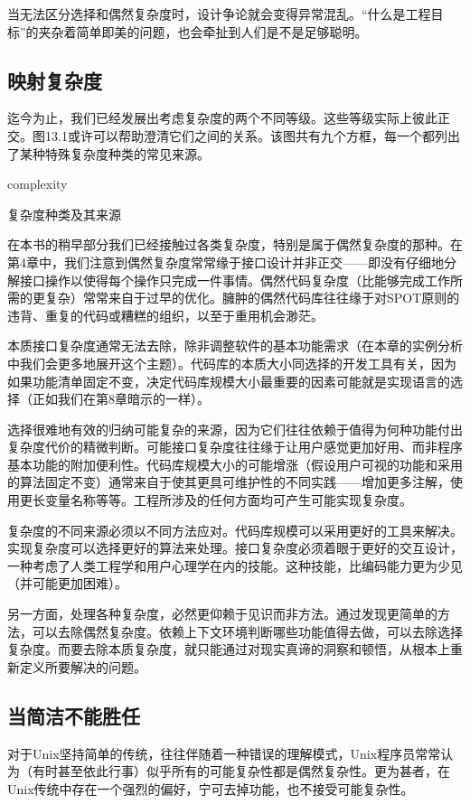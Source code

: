 \documentclass[12pt,oneside]{ctexbook}
\begin{document}
\begin{common-format}
当无法区分选择和偶然复杂度时，设计争论就会变得异常混乱。“什么是工程目标”的夹杂着简单即美的问题，也会牵扯到人们是不是足够聪明。

\subsection{映射复杂度}
迄今为止，我们已经发展出考虑复杂度的两个不同等级。这些等级实际上彼此正交。图13.1或许可以帮助澄清它们之间的关系。该图共有九个方框，每一个都列出了某种特殊复杂度种类的常见来源。

\begin{linefig}[0.8]{complexity}
\caption{复杂度种类及其来源}
\label{fig:complexity}
\end{linefig}

在本书的稍早部分我们已经接触过各类复杂度，特别是属于偶然复杂度的那种。在第4章中，我们注意到偶然复杂度常常缘于接口设计并非正交——即没有仔细地分解接口操作以使得每个操作只完成一件事情。偶然代码复杂度（比能够完成工作所需的更复杂）常常来自于过早的优化。臃肿的偶然代码库往往缘于对SPOT原则的违背、重复的代码或糟糕的组织，以至于重用机会渺茫。

本质接口复杂度通常无法去除，除非调整软件的基本功能需求（在本章的实例分析中我们会更多地展开这个主题）。代码库的本质大小同选择的开发工具有关，因为如果功能清单固定不变，决定代码库规模大小最重要的因素可能就是实现语言的选择（正如我们在第8章暗示的一样）。

选择很难地有效的归纳可能复杂的来源，因为它们往往依赖于值得为何种功能付出复杂度代价的精微判断。可能接口复杂度往往缘于让用户感觉更加好用、而非程序基本功能的附加便利性。代码库规模大小的可能增涨（假设用户可视的功能和采用的算法固定不变）通常来自于使其更具可维护性的不同实践——增加更多注解，使用更长变量名称等等。工程所涉及的任何方面均可产生可能实现复杂度。

复杂度的不同来源必须以不同方法应对。代码库规模可以采用更好的工具来解决。实现复杂度可以选择更好的算法来处理。接口复杂度必须着眼于更好的交互设计，一种考虑了人类工程学和用户心理学在内的技能。这种技能，比编码能力更为少见（并可能更加困难）。

另一方面，处理各种复杂度，必然更仰赖于见识而非方法。通过发现更简单的方法，可以去除偶然复杂度。依赖上下文环境判断哪些功能值得去做，可以去除选择复杂度。而要去除本质复杂度，就只能通过对现实真谛的洞察和顿悟，从根本上重新定义所要解决的问题。

\subsection{当简洁不能胜任}
对于Unix坚持简单的传统，往往伴随着一种错误的理解模式，Unix程序员常常认为（有时甚至依此行事）似乎所有的可能复杂性都是偶然复杂性。更为甚者，在Unix传统中存在一个强烈的偏好，宁可去掉功能，也不接受可能复杂性。


\end{common-format}
\end{document}
